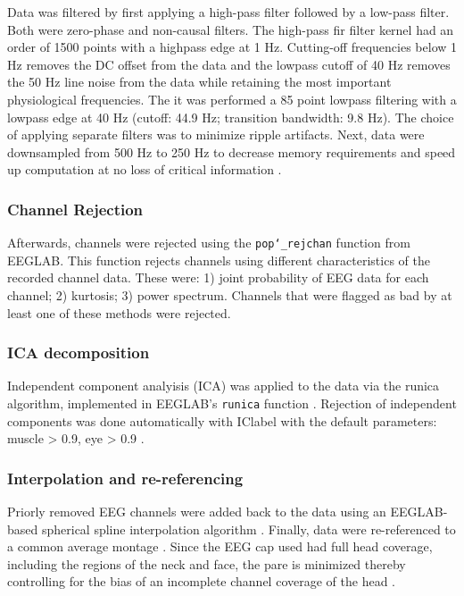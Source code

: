 Data was filtered by first applying a high-pass filter followed by a low-pass filter. Both were zero-phase and non-causal filters. The high-pass \acrfull{fir} filter kernel had an order of 1500 points with a highpass edge at 1 Hz. Cutting-off frequencies below 1 Hz removes the DC offset from the data and the lowpass cutoff of 40 Hz removes the 50 Hz line noise from the data while retaining the most important physiological frequencies. The it was performed a 85 point lowpass filtering with a lowpass edge at 40 Hz (cutoff: 44.9 Hz; transition bandwidth: 9.8 Hz). The choice of applying separate filters was to minimize ripple artifacts. Next, data were downsampled from 500 Hz to 250 Hz to decrease memory requirements and speed up computation at no loss of critical information \cite{cohenAnalyzingNeuralTime2014}.

\subsubsection{Channel Rejection}

Afterwards, channels were rejected using the \texttt{pop\char`_rejchan} function from EEGLAB. This function rejects channels using different characteristics of the recorded channel data. These were: 1) joint probability of EEG data for each channel; 2) kurtosis; 3) power spectrum. Channels that were flagged as bad by at least one of these methods were rejected.

\subsubsection{ICA decomposition}

Independent component analyisis (ICA) was applied to the data via the runica algorithm, implemented in EEGLAB's \texttt{runica} function \cite{makeigIndependentComponentAnalysis1995}. Rejection of independent components was done automatically with IClabel with the
default parameters: muscle > 0.9, eye > 0.9 \cite{pion-tonachiniICLabelAutomatedElectroencephalographic2019}.

\subsubsection{Interpolation and re-referencing}

Priorly removed EEG channels were added back to the data using an EEGLAB-based spherical spline interpolation algorithm \cite{perrinSphericalSplinesScalp1989}. Finally, data were re-referenced to a common average montage \cite{bertrandTheoreticalJustificationAverage1985}. Since the EEG cap used had full head coverage, including the regions of the neck and face, the \acrfull{pare} is minimized thereby controlling for the bias of an incomplete channel coverage of the head \cite{junghoferPolarAverageReference1999, nunezElectricFieldsBrain2006}.

